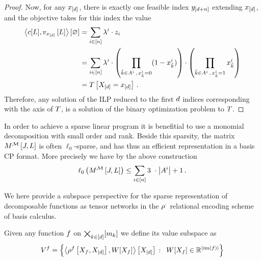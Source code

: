 \begin{proof}
	Now, for any $x_{[d]}$, there is exactly one feasible index $y_{[d+n]}$ extending $x_{[d]}$, and the objective takes for this index the value 
	\begin{align}
	 	 \left\langle c[L], v_{x_{[d]}}\left[L\right]\right\rangle \left[ \varnothing \right] 
		 &= \sum_{i\in[n]} \lambda^{i} \cdot z_{i} \\
		 &= \sum_{i\in[n]} \lambda^{i} \cdot \left( \prod_{\tilde{k}\in A^{i} \, , \,  x_{\tilde{k}}^i = 0} (1 - x_{\tilde{k}}^i) \right)
		\cdot \left( \prod_{\tilde{k}\in A^{i} \, , \,  x_{\tilde{k}}^i = 1}  x_{\tilde{k}}^i \right)  \\
		& = T\left[X_{[d]}=x_{[d]}\right] \, . 
	 \end{align}
	 Therefore, any solution of the ILP reduced to the first $d$ indices corresponding with the axis of $T$, is a solution of the binary optimization problem to $T$.
\end{proof}



In order to achieve a sparse linear program it is benefitial to use a monomial decomposition with small order and rank.
Beside this sparsity, the matrix $M^{\mathcal{M}}\left[J,L\right]$ is often $\ell_0$-sparse, and has thus an efficient representation in a basis CP format.
More precisely we have by the above construction 
\begin{align*}
	\sparsityof{\matrixofat{\sliceset}{\datvariable,\selvariable}} \leq \sum_{\decindexin} 3 \cdot \cardof{\variablesetof{\decindex}} +1 \, . 
\end{align*}


\label{sec:HT}


We here provide a subspace perspective for the sparse representation of decomposable functions as tensor networks in the $\rho^{\cdot}$ relational encoding scheme of basis calculus.

\begin{definition}
	Given any function $f$ on $\bigtimes_{k\in[d]}[m_{k}]$ we define its value subspace as 
		\[ \subspaceof{\exfunction} = \left\{\sbcontractionof{\rencodingofat{\exfunction}{\catvariableof{\exfunction},\shortcatvariables},W[\catvariableof{\exfunction}]}{\shortcatvariables} \, : \, W[\catvariableof{\exfunction}] \in \rr^{\cardof{\imageof{\exfunction}}} \right\} \]
\end{definition}

